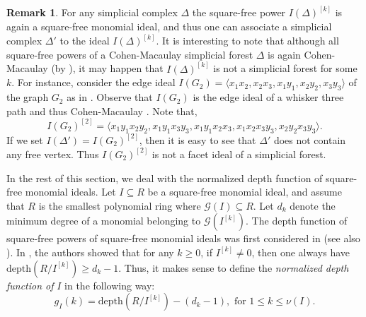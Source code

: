 \documentclass[12pt,a4paper,reqno]{amsart}
\theoremstyle{definition}
\newtheorem{remark}[proposition]{Remark}
\def\D{\Delta}
\def\l{\langle}
\def\r{\rangle}
\begin{document}
\begin{figure}[H]
    \caption{}
    \label{fig:2}
\end{figure}

\begin{remark}
For any simplicial complex $\Delta$ the square-free power $I(\D)^{[k]}$ is again a square-free monomial ideal, and thus one can associate a simplicial complex $\D'$ to the ideal $I(\D)^{[k]}$. It is interesting to note that although all square-free powers of a Cohen-Macaulay simplicial forest $\D$ is again Cohen-Macaulay (by ), it may happen that $I(\D)^{[k]}$ is not a simplicial forest for some $k$. For instance, consider the edge ideal $I(G_2)=\l x_1x_2, x_2x_3, x_1y_1, x_2y_2,x_3y_3\r$ of the graph $G_2$ as in . Observe that $I(G_2)$ is the edge ideal of a whisker three path and thus Cohen-Macaulay \cite{CM}. Note that, 
\[
I(G_2)^{[2]}=\l x_1y_1x_2y_2, x_1y_1x_3y_3, x_1y_1x_2x_3, x_1x_2x_3y_3, x_2y_2x_3y_3\r.
\] If we set $I(\D')=I(G_2)^{[2]}$, then it is easy to see that $\Delta'$ does not contain any free vertex. Thus $I(G_2)^{[2]}$ is not a facet ideal of a simplicial forest.
\end{remark}

In the rest of this section, we deal with the normalized depth function of square-free monomial ideals. Let $I\subseteq R$ be a square-free monomial ideal, and assume that $R$ is the smallest polynomial ring where $\mathcal{G}(I)\subseteq R$. Let $d_k$ denote the minimum degree of a monomial belonging to $\mathcal{G}(I^{[k]})$. The depth function of square-free powers of square-free monomial ideals was first considered in \cite{EHHM12} (see also \cite{FiHeHi}). In \cite{EHHM12}, the authors showed that for any $k\geq 0$, if $I^{[k]}\neq 0$, then one always have $\mathrm{depth}(R/I^{[k]})\geq d_k-1$. Thus, it makes sense to define the \textit{normalized depth function of }$I$ in the following way:
\[
g_I(k)=\mathrm{depth}(R/I^{[k]})- (d_k-1), \text{ for }1\leq k\leq \nu(I). 
\]
\end{document}
